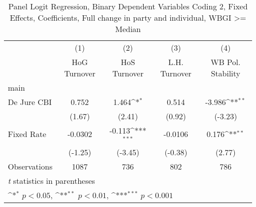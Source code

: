 \begin{table}[htbp]\centering
\def\sym#1{\ifmmode^{#1}\else\(^{#1}\)\fi}
\caption{Panel Logit Regression, Binary Dependent Variables Coding 2, Fixed Effects, Coefficients, Full change in party and individual, WBGI >= Median \label{logitFEMultInd2DJ}}
\begin{tabular}{l*{4}{c}}
\toprule
                                        &\multicolumn{1}{c}{(1)}&\multicolumn{1}{c}{(2)}&\multicolumn{1}{c}{(3)}&\multicolumn{1}{c}{(4)}\\
                                        &\multicolumn{1}{c}{HoG Turnover}&\multicolumn{1}{c}{HoS Turnover}&\multicolumn{1}{c}{L.H. Turnover}&\multicolumn{1}{c}{WB Pol. Stability}\\
\midrule
main                                    &                  &                  &                  &                  \\
De Jure CBI                             &    0.752         &    1.464\sym{*}  &    0.514         &   -3.986\sym{**} \\
                                        &   (1.67)         &   (2.41)         &   (0.92)         &  (-3.23)         \\
\addlinespace
Fixed Rate                              &  -0.0302         &   -0.113\sym{***}&  -0.0106         &    0.176\sym{**} \\
                                        &  (-1.25)         &  (-3.45)         &  (-0.38)         &   (2.77)         \\
\midrule
Observations                            &     1087         &      736         &      802         &      786         \\
\bottomrule
\multicolumn{5}{l}{\footnotesize \textit{t} statistics in parentheses}\\
\multicolumn{5}{l}{\footnotesize \sym{*} \(p<0.05\), \sym{**} \(p<0.01\), \sym{***} \(p<0.001\)}\\
\end{tabular}
\end{table}
